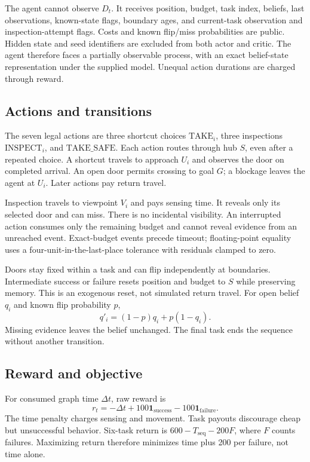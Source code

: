 \documentclass[journal]{IEEEtai}
\begin{document}
The agent cannot observe $D_t$. It receives position, budget, task index, beliefs, last observations, known-state flags, boundary ages, and current-task observation and inspection-attempt flags. Costs and known flip/miss probabilities are public. Hidden state and seed identifiers are excluded from both actor and critic. The agent therefore faces a partially observable process, with an exact belief-state representation under the supplied model. Unequal action durations are charged through reward.

\subsection{Actions and transitions}
The seven legal actions are three shortcut choices $\mathrm{TAKE}_i$, three inspections $\mathrm{INSPECT}_i$, and $\mathrm{TAKE\_SAFE}$. Each action routes through hub $S$, even after a repeated choice. A shortcut travels to approach $U_i$ and observes the door on completed arrival. An open door permits crossing to goal $G$; a blockage leaves the agent at $U_i$. Later actions pay return travel.

Inspection travels to viewpoint $V_i$ and pays sensing time. It reveals only its selected door and can miss. There is no incidental visibility. An interrupted action consumes only the remaining budget and cannot reveal evidence from an unreached event. Exact-budget events precede timeout; floating-point equality uses a four-unit-in-the-last-place tolerance with residuals clamped to zero.

Doors stay fixed within a task and can flip independently at boundaries. Intermediate success or failure resets position and budget to $S$ while preserving memory. This is an exogenous reset, not simulated return travel. For open belief $q_i$ and known flip probability $p$,
\begin{equation}
q'_i=(1-p)q_i+p(1-q_i).
\end{equation}
Missing evidence leaves the belief unchanged. The final task ends the sequence without another transition.

\subsection{Reward and objective}
For consumed graph time $\Delta t$, raw reward is
\begin{equation}
r_t=-\Delta t+100\mathbf{1}_{\mathrm{success}}-100\mathbf{1}_{\mathrm{failure}}.
\end{equation}
The time penalty charges sensing and movement. Task payouts discourage cheap but unsuccessful behavior. Six-task return is $600-T_{\mathrm{seq}}-200F$, where $F$ counts failures. Maximizing return therefore minimizes time plus 200 per failure, not time alone.
\end{document}
